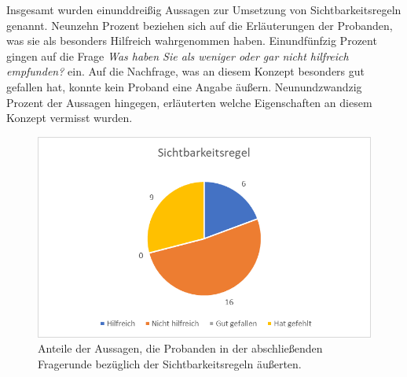 %
%
Insgesamt wurden einunddreißig Aussagen zur Umsetzung von Sichtbarkeitsregeln genannt. Neunzehn Prozent beziehen sich auf die Erläuterungen der Probanden, was sie als besonders Hilfreich wahrgenommen haben. Einundfünfzig Prozent gingen auf die Frage \emph{Was haben Sie als weniger oder gar nicht hilfreich empfunden?} ein. Auf die Nachfrage, was an diesem Konzept besonders gut gefallen hat, konnte kein Proband eine Angabe äußern. Neunundzwandzig Prozent der Aussagen hingegen, erläuterten welche Eigenschaften an diesem Konzept vermisst wurden.


\begin{figure}[h]
\centering
\includegraphics[width=1\textwidth]{pictures/diagramme/aussagensichtb}
\caption{Anteile der Aussagen, die Probanden in der abschließenden Fragerunde bezüglich der Sichtbarkeitsregeln äußerten.}
\label{aussagensichtb}
\end{figure}

